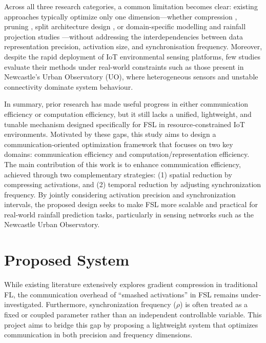 \documentclass[conference]{IEEEtran}
\begin{document}
Across all three research categories, a common limitation becomes clear: existing approaches typically optimize only one dimension—whether compression \cite{10078005}, pruning \cite{10050151}, split architecture design \cite{2023arXiv230205599M,2026ITWC...25.1981L}, or domain-specific modelling and rainfall projection studies \cite{CHAN2023100375,10.3389/frwa.2024.1378598}—without addressing the interdependencies between data representation precision, activation size, and synchronisation frequency. Moreover, despite the rapid deployment of IoT environmental sensing platforms, few studies evaluate their methods under real-world constraints such as those present in Newcastle’s Urban Observatory (UO), where heterogeneous sensors and unstable connectivity dominate system behaviour. 

In summary, prior research has made useful progress in either communication efficiency or computation efficiency, but it still lacks a unified, lightweight, and tunable mechanism designed specifically for FSL in resource‑constrained IoT environments. Motivated by these gaps, this study aims to design a communication‑oriented optimization framework that focuses on two key domains: communication efficiency and computation/representation efficiency.
The main contribution of this work is to enhance communication efficiency, achieved through two complementary strategies:
(1) spatial reduction by compressing activations, and
(2) temporal reduction by adjusting synchronization frequency.
By jointly considering activation precision and synchronization intervals, the proposed design seeks to make FSL more scalable and practical for real‑world rainfall prediction tasks, particularly in sensing networks such as the Newcastle Urban Observatory.



\section{Proposed System}
\label{sec:system}

While existing literature extensively explores gradient compression in traditional FL, the communication overhead of ``smashed activations'' in FSL remains under-investigated. Furthermore, synchronization frequency ($\rho$) is often treated as a fixed or coupled parameter rather than an independent controllable variable. This project aims to bridge this gap by proposing a lightweight system that optimizes communication in both precision and frequency dimensions.
\end{document}
